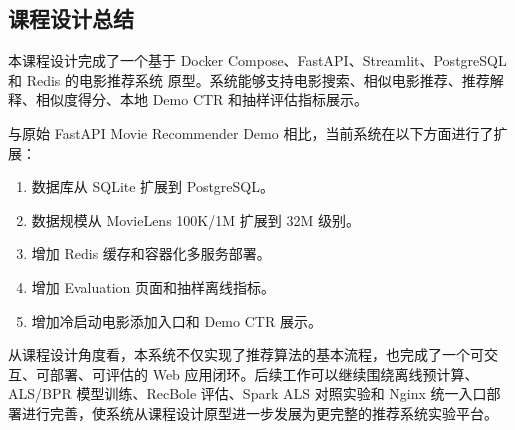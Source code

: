 \subsection{课程设计总结}

本课程设计完成了一个基于 Docker Compose、FastAPI、Streamlit、PostgreSQL 和 Redis 的电影推荐系统
原型。系统能够支持电影搜索、相似电影推荐、推荐解释、相似度得分、本地 Demo CTR 和抽样评估指标展示。

与原始 FastAPI Movie Recommender Demo 相比，当前系统在以下方面进行了扩展：

\begin{enumerate}[leftmargin=2em]
  \item 数据库从 SQLite 扩展到 PostgreSQL。
  \item 数据规模从 MovieLens 100K/1M 扩展到 32M 级别。
  \item 增加 Redis 缓存和容器化多服务部署。
  \item 增加 Evaluation 页面和抽样离线指标。
  \item 增加冷启动电影添加入口和 Demo CTR 展示。
\end{enumerate}

从课程设计角度看，本系统不仅实现了推荐算法的基本流程，也完成了一个可交互、可部署、可评估的 Web
应用闭环。后续工作可以继续围绕离线预计算、ALS/BPR 模型训练、RecBole 评估、Spark ALS 对照实验和
Nginx 统一入口部署进行完善，使系统从课程设计原型进一步发展为更完整的推荐系统实验平台。

\newpage
